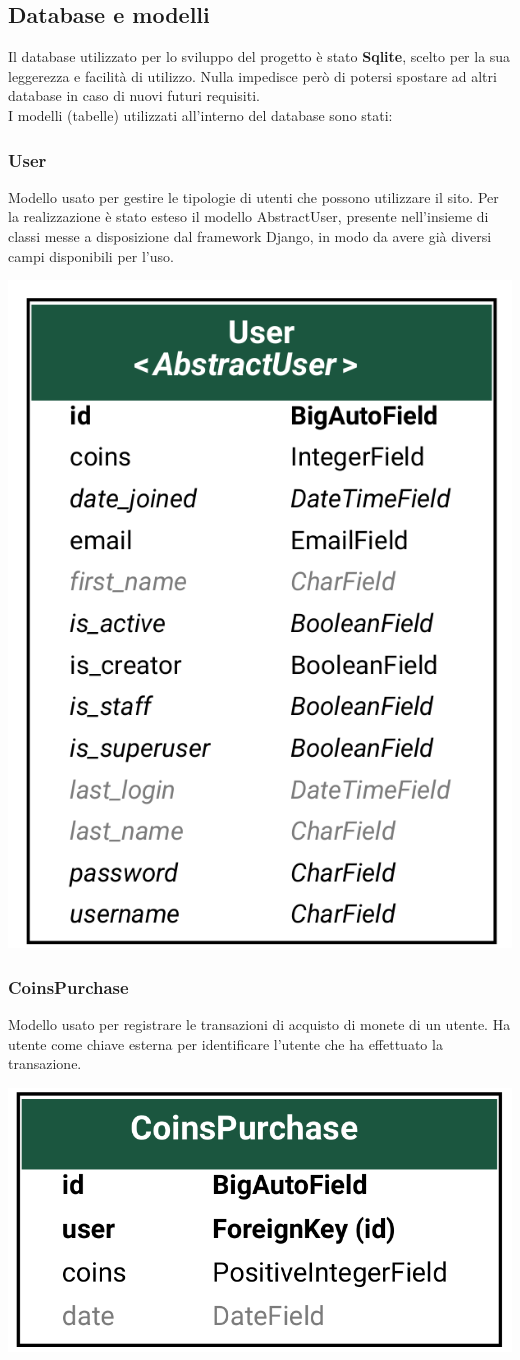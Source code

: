 \subsection{Database e modelli}
Il database utilizzato per lo sviluppo del progetto è stato \textbf{Sqlite}, scelto per la
sua leggerezza e facilità di utilizzo. Nulla impedisce però di potersi spostare ad
altri database in caso di nuovi futuri requisiti.
\\I modelli (tabelle) utilizzati all’interno del database sono stati:

\subsubsection{User}
Modello usato per gestire le tipologie di utenti che possono utilizzare il sito. Per
la realizzazione è stato esteso il modello AbstractUser, presente nell’insieme di
classi messe a disposizione dal framework Django, in modo da avere già diversi
campi disponibili per l’uso.

\begin{center}
  \includegraphics[width=0.4\linewidth]{images/user.png}
\end{center}

\subsubsection{CoinsPurchase}
Modello usato per registrare le transazioni di acquisto di monete di un utente.
Ha utente come chiave esterna per identificare l’utente che ha effettuato la transazione.
\begin{center}
  \includegraphics[width=0.4\linewidth]{images/coins-purchase.png}
\end{center}


